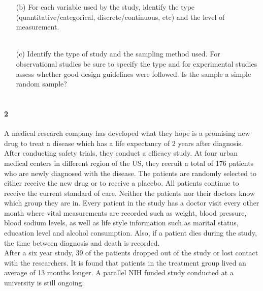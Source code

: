 \documentclass{article}
\begin{document}
\begin{flushleft}
\begin{itemize}
\item[(b)] For each variable used by the study, identify the type (quantitative/categorical, discrete/continuous, etc) and the level of measurement.\\
\medskip
{}\\
\vspace{.25in}
\item[(c)] Identify the type of study and the sampling method used. For observational studies be sure to specify the type and for experimental studies assess whether good design guidelines were followed. Is the sample a simple random sample? \\
\medskip
{}\\
\end{itemize}



\newpage
\paragraph{2} A medical research company has developed what they hope is a promising new drug to treat a disease which has a life expectancy of 2 years after diagnosis. After conducting safety trials, they conduct a efficacy study. At four urban medical centers in different region of the US, they recruit a total of 176 patients who are newly diagnosed with the disease. The patients are randomly selected to either receive the new drug or to receive a placebo. All patients continue to receive the current standard of care. Neither the patients nor their doctors know which group they are in. Every patient in the study has a doctor visit every other month where vital measurements are recorded such as weight, blood pressure, blood sodium levels, as well as life style information such as marital status, education level and alcohol consumption. Also, if a patient dies during the study, the time between diagnosis and death is recorded.\\
\medskip
After a six year study, 39 of the patients dropped out of the study or lost contact with the researchers. It is found that patients in the treatment group lived an average of 13 months longer. A parallel NIH funded study conducted at a university is still ongoing.


\end{flushleft}
\end{document}
